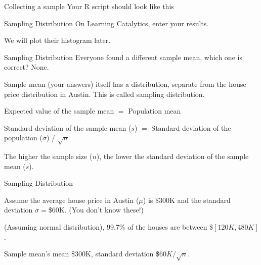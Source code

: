 \documentclass{beamer}\usepackage[]{graphicx}\usepackage[]{color}
\begin{document}
\begin{darkframes}
    \begin{frame}[label=lists]{Collecting a sample}
    Your R script should look like this
    \sampleZillow
    
    \end{frame}


    \begin{frame}[label=lists]{Sampling Distribution} 
		On Learning Catalytics, enter your results. \newline
		
		We will plot their histogram later.		
    \end{frame}



    \begin{frame}[label=lists]{Sampling Distribution}
    	Everyone found a different sample mean, which one is correct?
    	None. \newline %
    	
    	Sample mean (your answers) itself has a distribution, separate from the house price distribution in Austin. This is called  \alert{sampling distribution}. \newline
    	
    	Expected value of the sample mean $=$ Population mean
    	
    	Standard deviation of the sample mean ($s$) $=$ Standard deviation of the population ($\sigma$) / $\sqrt{n}$ \newline
    	
    	The higher the sample size ($n$), the lower the standard deviation of the sample mean ($s$).
		
    \end{frame}
    
    
    
    \begin{frame}[label=lists]{Sampling Distribution}
    
    Assume the average house price in Austin ($\mu$) is \$300K and the standard deviation $\sigma=$\$60K. (You don't know these!) \newline
    
    (Assuming normal distribution), 99.7\% of the houses are between \$$[120K, 480K]$. \newline
    
    Sample mean's mean \$$300$K, standard deviation \$$60K/\sqrt{n}$. \newline
    

\end{frame}
\end{darkframes}
\end{document}
